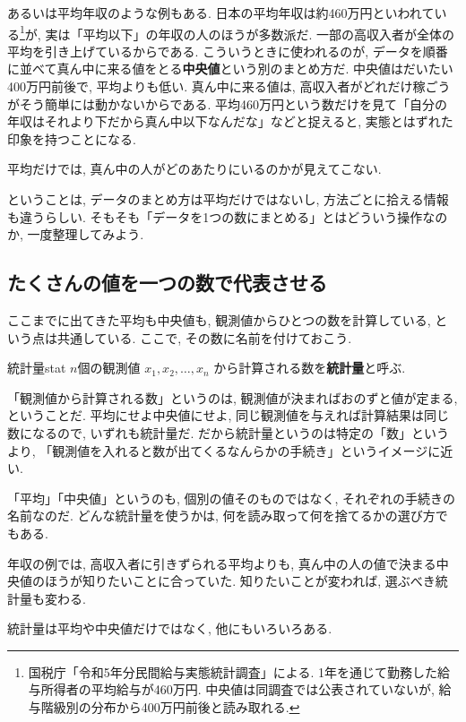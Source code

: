     あるいは平均年収のような例もある.
    日本の平均年収は約460万円といわれている\footnote{%
    国税庁「令和5年分民間給与実態統計調査」による. 1年を通じて勤務した給与所得者の平均給与が460万円. 中央値は同調査では公表されていないが, 給与階級別の分布から400万円前後と読み取れる.}が, 実は「平均以下」の年収の人のほうが多数派だ.
    一部の高収入者が全体の平均を引き上げているからである.
    こういうときに使われるのが, データを順番に並べて真ん中に来る値をとる\textbf{中央値}という別のまとめ方だ.
    中央値はだいたい400万円前後で, 平均よりも低い.
    真ん中に来る値は, 高収入者がどれだけ稼ごうがそう簡単には動かないからである.
    平均460万円という数だけを見て「自分の年収はそれより下だから真ん中以下なんだな」などと捉えると, 実態とはずれた印象を持つことになる.

    平均だけでは, 真ん中の人がどのあたりにいるのかが見えてこない.

    ということは, データのまとめ方は平均だけではないし, 方法ごとに拾える情報も違うらしい.
    そもそも「データを1つの数にまとめる」とはどういう操作なのか, 一度整理してみよう.


  \subsection{たくさんの値を一つの数で代表させる}

    ここまでに出てきた平均も中央値も, 観測値からひとつの数を計算している, という点は共通している.
    ここで, その数に名前を付けておこう.

    \begin{defi}{統計量}{stat}
      $n$個の観測値 $x_1, x_2, \ldots, x_n$ から計算される数を\textbf{統計量}と呼ぶ.
    \end{defi}

    「観測値から計算される数」というのは, 観測値が決まればおのずと値が定まる, ということだ.
    平均にせよ中央値にせよ, 同じ観測値を与えれば計算結果は同じ数になるので, いずれも統計量だ.
    だから統計量というのは特定の「数」というより, 「観測値を入れると数が出てくるなんらかの手続き」というイメージに近い.

    「平均」「中央値」というのも, 個別の値そのものではなく, それぞれの手続きの名前なのだ.
    どんな統計量を使うかは, 何を読み取って何を捨てるかの選び方でもある.

    年収の例では, 高収入者に引きずられる平均よりも, 真ん中の人の値で決まる中央値のほうが知りたいことに合っていた.
    知りたいことが変われば, 選ぶべき統計量も変わる.

    統計量は平均や中央値だけではなく, 他にもいろいろある.


